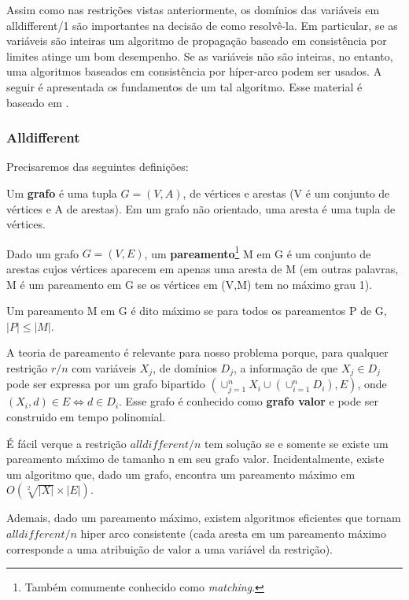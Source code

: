 \documentclass{article}
\begin{document}
Assim como nas restrições vistas anteriormente, os domínios das variáveis em alldifferent/1 são importantes na decisão de como
resolvê-la. Em particular, se as variáveis são inteiras um algoritmo de propagação baseado em consistência por limites atinge
um bom desempenho. Se as variáveis não são inteiras, no entanto, uma algoritmos baseados em consistência por híper-arco
podem ser usados. A seguir é apresentada os fundamentos de um tal algoritmo. Esse material é baseado em \cite{basileos}.

\subsubsection{Alldifferent}

Precisaremos das seguintes definições:

\begin{definition}
  Um \textbf{grafo} é uma tupla $G = (V,A)$, de vértices e arestas (V é um conjunto de vértices e A de arestas).
  Em um grafo não orientado, uma aresta é  uma tupla de vértices.
\end{definition}


Dado um grafo $G = (V,E)$, um \textbf{pareamento}\footnote{Também comumente conhecido como {\it matching}.} M em G é um conjunto de arestas cujos vértices aparecem em apenas uma aresta de M (em outras
palavras, M é um pareamento em G se os vértices em (V,M) tem no máximo grau 1).

\begin{definition}
  Um pareamento M em G é dito máximo se para todos os pareamentos P de G, $|P| \leq |M|$.
\end{definition}

A teoria de pareamento é relevante para nosso problema porque, para qualquer restrição $r/n$ com variáveis $X_j$, de domínios
$D_j$, a informação de que $X_j \in D_j$ pode ser expressa por um grafo bipartido $(\cup_{j=1}^nX_i\cup(\cup_{i=1}^nD_i),E)$, onde $(X_i,d) \in E \Leftrightarrow d \in D_i$. Esse grafo é conhecido como \textbf{grafo valor} e pode ser construido em tempo polinomial.

É fácil verque a restrição $alldifferent/n$ tem solução se e somente se existe um pareamento máximo de tamanho n em seu grafo valor. Incidentalmente, existe um algoritmo que, dado um grafo, encontra um pareamento máximo em $O(\sqrt[2]{|X|}\times|E|)$.

Ademais, dado um pareamento máximo, existem algoritmos eficientes que tornam $alldifferent/n$ hiper arco consistente (cada aresta em um pareamento máximo corresponde a uma atribuição de valor a uma variável da restrição).
\end{document}
